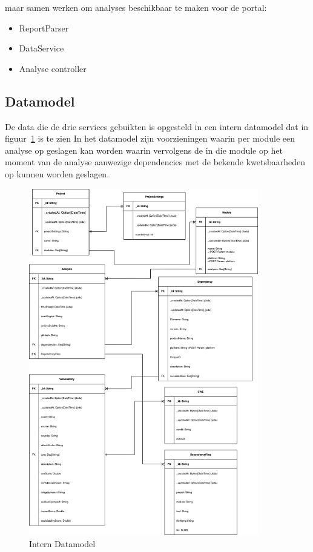 maar samen werken om analyses beschikbaar te maken voor de portal:
\begin{itemize}
    \item ReportParser
    \item DataService
    \item Analyse controller
\end{itemize}

\subsection{Datamodel}\label{subsec:intern-datamodel}
De data die de drie services gebuikten is opgesteld in een intern datamodel dat in figuur~\ref{fig:SOUP-SoupApiDm} is te zien In het datamodel zijn voorzieningen waarin per module een analyse op geslagen kan worden waarin vervolgens de in die module op het moment van de analyse aanwezige dependencies met de bekende kwetsbaarheden op kunnen worden geslagen.
\begin{figure}[bth]
    \myfloatalign
    \includegraphics[width=10cm]{gfx/SOUPAPI-SOUPAPI DM}
    \caption{Intern Datamodel}
    \label{fig:SOUP-SoupApiDm}
\end{figure}

